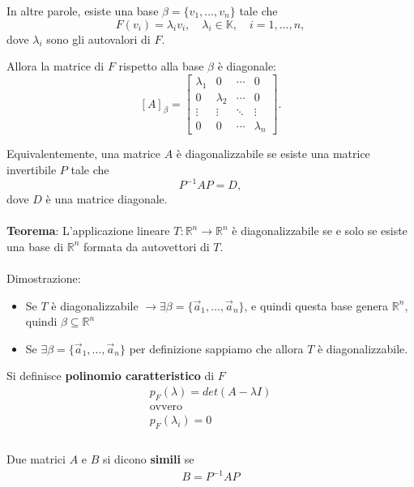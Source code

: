 \documentclass[10pt]{extarticle}
\begin{document}
In altre parole, esiste una base \( \beta = \{v_1, \dots, v_n\} \) tale che
\[
F(v_i) = \lambda_i v_i, \quad \lambda_i \in \mathbb{K}, \quad i=1,\dots,n,
\]
dove \( \lambda_i \) sono gli autovalori di \( F \).

Allora la matrice di \( F \) rispetto alla base \( \beta \) è diagonale:
\[
[A]_{\beta} = 
\begin{bmatrix}
\lambda_1 & 0 & \cdots & 0 \\
0 & \lambda_2 & \cdots & 0 \\
\vdots & \vdots & \ddots & \vdots \\
0 & 0 & \cdots & \lambda_n
\end{bmatrix}.
\]

Equivalentemente, una matrice \( A \) è diagonalizzabile se esiste una matrice invertibile \( P \) tale che
\[
P^{-1} A P = D,
\]
dove \( D \) è una matrice diagonale. \\
\vspace{1em} \\
\textbf{Teorema}: L'applicazione lineare \( T: \mathbb{R}^n \to \mathbb{R}^n \) è diagonalizzabile se e solo se esiste una base di \( \mathbb{R}^n \) formata da autovettori di \( T \). \\
\vspace{5px} \\
Dimostrazione: 
\begin{itemize}
    \item[\(\Rightarrow\)] Se \(T\) è diagonalizzabile \(\to \exists \beta=\{\vec{a}_1,\dots,\vec{a}_n\}\), e quindi questa base genera \(\mathbb{R}^n\), quindi \(\beta \subseteq \mathbb{R}^n\)
    \item[\(\Leftarrow\)] Se \(\exists \beta=\{\vec{a}_1,\dots,\vec{a}_n\}\) per definizione sappiamo che allora \(T\) è diagonalizzabile.
\end{itemize}
\vspace{1em}
Si definisce \textbf{polinomio caratteristico} di $F$
\begin{align*}
    p_{F}(\lambda)=det(A-\lambda I) \\
    \text{ovvero} \\
    p_{F}(\lambda_i)=0 \\ 
\end{align*}
\vspace{5px} \\
Due matrici $A$ e $B$ si dicono \textbf{simili} se 
\begin{align*}
    B=P^{-1}AP
\end{align*}
\end{document}
